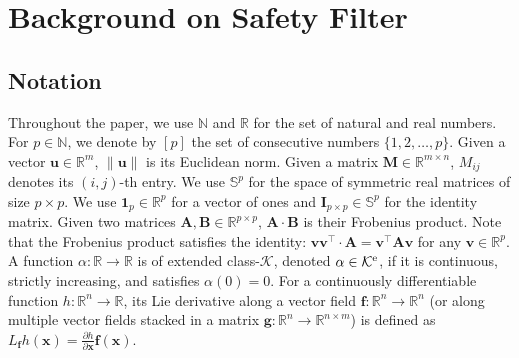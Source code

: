 \documentclass[10pt,twocolumn,twoside]{IEEEtran}
\newcommand{\naturals}{\mathbb{N}}
\newcommand{\real}{\mathbb{R}}
\newcommand{\until}[1]{[#1]}
\newcommand{\map}[3]{#1:#2 \rightarrow #3}
\newcommand{\Kc}{\mathcal{K}}
\newcommand{\Ke}{\Kc^{\rm e}}
\theoremstyle{definition}
\renewcommand{\bf}{\mathbf{f}} %
\newcommand{\bg}{\mathbf{g}}
\newcommand{\bu}{\mathbf{u}}
\newcommand{\bv}{\mathbf{v}}
\newcommand{\bx}{\mathbf{x}}
\newcommand{\bA}{\mathbf{A}}
\newcommand{\bB}{\mathbf{B}}
\newcommand{\bI}{\mathbf{I}}
\newcommand{\bM}{\mathbf{M}}
\begin{document}
\section{Background on Safety Filter}
\subsection{Notation}
Throughout the paper, we use $\naturals$ and $\real$ for the set of natural and real numbers. For $p\in\naturals$, we denote by $\until{p}$ the set of consecutive numbers $\{1,2,\ldots,p\}$. Given a vector $\bu\in\real^m$, $\|\bu\|$ is its Euclidean norm. Given a matrix $\bM\in\real^{m\times n}$, $M_{ij}$ denotes its $(i,j)$-th entry. We use $\mathbb S^p$ for the space of symmetric real matrices of size $p\times p$. 
We use $\mathbf{1}_p\in\real^p$ for a vector of ones and $\bI_{p\times p}\in\mathbb S^p$ for the identity matrix. Given two matrices $\bA,\bB\in\real^{p\times p}$, $\bA\cdot\bB$ is their Frobenius product. Note that the Frobenius product satisfies the identity: $\bv\bv^\top\cdot \bA = \bv^\top \bA\bv$ for any $\bv\in\real^p$. A function $\map{\alpha}{\real}{\real}$ is of extended class-$\Kc$, denoted $\alpha\in\Ke$, if it is continuous, strictly increasing, and satisfies $\alpha(0)=0$. For a continuously differentiable function $\map{h}{\real^n}{\real}$, its Lie derivative along a vector field $\map{\bf}{\real^n}{\real^n}$ (or along multiple vector fields stacked in a matrix $\map{\bg}{\real^n}{\real^{n\times m}}$) is defined as $L_\bf h(\bx)=\frac{\partial h}{\partial \bx} \bf(\bx)$.
\end{document}
